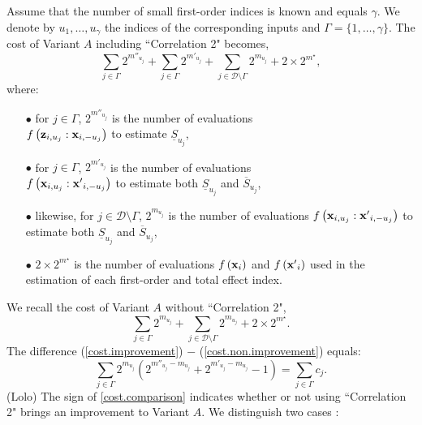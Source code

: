 Assume that the number of small first-order indices is known and equals $\gamma$. We denote by $u_1,\dots,u_{\gamma}$ the indices of the corresponding inputs and $\Gamma = \{1,\dots,\gamma\}$. The cost of Variant $A$ including ``Correlation 2" becomes, 
\begin{equation}
\sum \limits_{j \in \Gamma} 2^{m''_{u_j}} + \sum \limits_{j \in \Gamma} 2^{m'_{u_j}} + \sum \limits_{j \in \mathcal{D}\setminus{\Gamma}} 2^{m_{u_j}} + 2 \times 2^{m^\star},
\label{cost.improvement}
\end{equation}
where: %
\begin{itemize}
\item[$\bullet$] for $j\in \Gamma$, $2^{m''_{u_j}}$ is the number of evaluations \\ $f\left(\boldsymbol{\mathbf{z}}_{i,u_j}:\boldsymbol{\mathbf{x}}_{i,-u_j}\right)$ to estimate $\underline{S}_{u_j}$,
\item[$\bullet$] for $j\in \Gamma$, $2^{m'_{u_j}}$ is the number of evaluations \\ $f\left(\boldsymbol{\mathbf{x}}_{i,u_j}:{\boldsymbol{\mathbf{x}}'}_{i,-u_j}\right)$ to estimate both $\underline{S}_{u_j}$ and  $\overline{S}_{u_j}$,
\item[$\bullet$] likewise, for $j\in \mathcal{D}\setminus{\Gamma}$, $ 2^{m_{u_j}}$ is the number of evaluations $f\left(\boldsymbol{\mathbf{x}}_{i,u_j}:{\boldsymbol{\mathbf{x}}'}_{i,-u_j}\right)$ to estimate both $\underline{S}_{u_j}$ and  $\overline{S}_{u_j}$,
\item[$\bullet$] $2 \times 2^{m^{\star}}$ is the number of evaluations $f\left(\boldsymbol{\mathbf{x}}_{i}\right)$ and $f\left({\boldsymbol{\mathbf{x}}'}_{i}\right)$ used in the estimation of each first-order and total effect index.
\end{itemize}
We recall the cost of Variant $A$ without  ``Correlation 2",
\begin{equation}
\sum \limits_{j \in \Gamma} 2^{m_{u_j}} + \sum \limits_{j \in \mathcal{D}\setminus{\Gamma}} 2^{m_{u_j}} + 2 \times 2^{m^{\star}}. 
\label{cost.non.improvement}
\end{equation}
The difference (\ref{cost.improvement}) $-$ (\ref{cost.non.improvement}) equals:
\begin{equation}
 \sum \limits_{j \in \Gamma} 2^{m_{u_j}} \left(2^{m''_{u_j}-m_{u_j}}  + 2^{m'_{u_j}-m_{u_j}} - 1 \right) = \sum \limits_{j \in \Gamma} c_j.
\label{cost.comparison}
\end{equation}
{\color{purple} (Lolo) The sign of \eqref{cost.comparison}} indicates whether or not using ``Correlation 2" brings an improvement to Variant $A$. We distinguish two cases :
